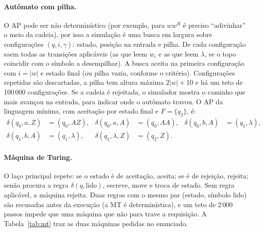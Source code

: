\documentclass[12pt,a4paper]{article}
\newcommand{\lam}{\lambda}
\begin{document}
\paragraph{Autômato com pilha.} O AP pode ser não determinístico (por exemplo,
para $ww^R$ é preciso ``adivinhar'' o meio da cadeia), por isso a simulação é
uma busca em largura sobre configurações $(q, i, \gamma)$: estado, posição na
entrada e pilha. De cada configuração saem todas as transições aplicáveis
(as que leem $w_i$ e as que leem $\lam$, se o topo coincidir com o símbolo a
desempilhar). A busca aceita na primeira configuração com $i = |w|$ e estado
final (ou pilha vazia, conforme o critério). Configurações repetidas são
descartadas, a pilha tem altura máxima $2|w| + 10$ e há um teto de 100\,000
configurações. Se a cadeia é rejeitada, o simulador mostra o caminho que mais
avançou na entrada, para indicar onde o autômato travou. O AP da linguagem
mínima, com aceitação por estado final e $F = \{q_2\}$, é:
\[
\begin{aligned}
  \delta(q_0, a, Z) &= (q_0, AZ), & \delta(q_0, a, A) &= (q_0, AA), &
  \delta(q_0, b, A) &= (q_1, \lam),\\
  \delta(q_1, b, A) &= (q_1, \lam), & \delta(q_1, \lam, Z) &= (q_2, Z). &&
\end{aligned}
\]

\paragraph{Máquina de Turing.} O laço principal repete: se o estado é de
aceitação, aceita; se é de rejeição, rejeita; senão procura a regra
$\delta(q, \text{lido})$, escreve, move e troca de estado. Sem regra aplicável,
a máquina rejeita. Duas regras com o mesmo par (estado, símbolo lido) são
recusadas antes da execução (a MT é determinística), e um teto de 2\,000 passos
impede que uma máquina que não para trave a requisição. A
Tabela~\ref{tab:mt} traz as duas máquinas pedidas no enunciado.
\end{document}
